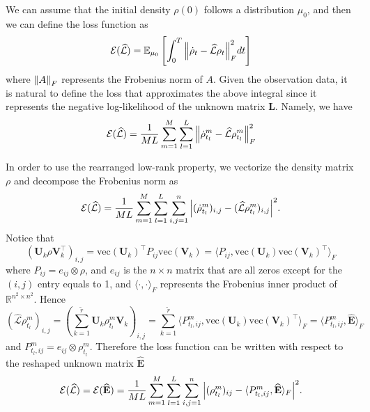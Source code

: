 \documentclass[10pt]{article}  %
\theoremstyle{plain}
\numberwithin{equation}{section}
\newcommand{\innerp}[1]{\langle{#1}\rangle}
\def\mL{\mathcal{L}}
\def\mE{\mathcal{E}}
\def\R{\mathbb{R}}
\newcommand{\bL}{\mathbf{L}}
\newcommand{\bV}{\mathbf{V}}
\newcommand{\bU}{\mathbf{U}}
\newcommand{\bE}{\mathbf{E}}
\renewcommand{\vec}{\text{vec}}
\begin{document}
We can assume that the initial density $\rho(0)$ follows a distribution $\mu_0$, and then we can define the loss function as
\begin{equation}
	\mE(\widehat{\mL}) = \mathbb{E}_{\mu_0}\left[\int_0^T \norm{\dot{\rho}_t - \widehat{\mL}\rho_t }_F^2 dt\right]
\end{equation}
where $\norm{A}_F$ represents the Frobenius norm of $A$. Given the observation data, it is natural to define the loss that approximates the above integral since it represents the negative log-likelihood of the unknown matrix $\bL$. Namely, we have 
\begin{equation}
	\mE(\widehat{\mL}) = \frac{1}{ML}\sum_{m = 1}^M\sum_{l = 1}^L \norm{\dot{\rho}^{m}_{t_l} - \widehat{\mL}\rho^m_{t_l} }_F^2
\end{equation}

In order to use the rearranged low-rank property, we vectorize the density matrix $\rho$ and decompose the Frobenius norm as 
\begin{equation}
	\mE(\widehat{\mL}) = \frac{1}{ML}\sum_{m = 1}^M\sum_{l = 1}^L\sum_{i, j = 1}^n \abs{(\dot{\rho}^{m}_{t_l})_{i, j } - (\widehat{\mL}\rho^m_{t_l})_{i, j}}^2.
\end{equation}
Notice that 
\begin{equation}
	(\bU_k\rho \bV_k^\top)_{i, j} = \vec(\bU_k)^\top P_{ij} \vec(\bV_k) = \innerp{P_{ij}, \vec(\bU_k)\vec(\bV_k)^\top}_F
\end{equation}
where $P_{ij} = e_{ij} \otimes \rho$, and $e_{ij}$ is the $n\times n$ matrix that are all zeros except for the $(i, j)$ entry equals to 1, and $\innerp{\cdot, \cdot}_F$ represents the Frobenius inner product of $\R^{n^2\times n^2}$. Hence 
\begin{equation}
	(\widehat{\mL}\rho^m_{t_l})_{i, j} = \left(\sum_{k = 1}^{\widetilde{r}}\bU_k\rho^m_{t_l}\bV_k\right)_{i, j} = \sum_{k = 1}^{\widetilde{r}}\innerp{P^m_{t_l, ij}, \vec(\bU_k)\vec(\bV_k)^\top}_F = \innerp{P^m_{t_l, ij}, \widehat{\bE}}_F
\end{equation}
and $P^m_{t_l, ij} = e_{ij}\otimes \rho^m_{t_l}$.
Therefore the loss function can be written with respect to the reshaped unknown matrix $\widehat{\bE}$
\begin{equation}
	\mE(\widehat{\mL}) = \mE(\widehat{\bE}) = \frac{1}{ML}\sum_{m = 1}^M\sum_{l = 1}^L\sum_{i, j = 1}^n \abs{(\rho^m_{t_l})_{ij} - \innerp{P^m_{t_l, ij}, \widehat{\bE}}_F}^2.
\end{equation}
\end{document}
